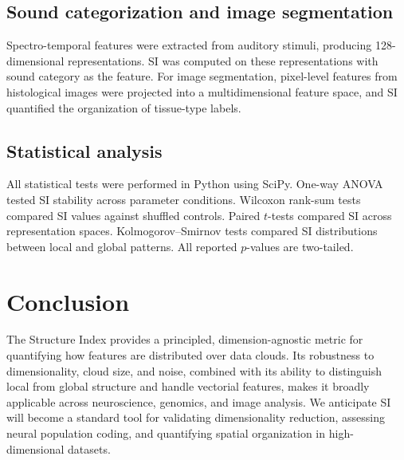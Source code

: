 \documentclass[11pt]{article}
\begin{document}
\subsection{Sound categorization and image segmentation}

Spectro-temporal features were extracted from auditory stimuli, producing 128-dimensional representations. SI was computed on these representations with sound category as the feature. For image segmentation, pixel-level features from histological images were projected into a multidimensional feature space, and SI quantified the organization of tissue-type labels.

\subsection{Statistical analysis}

All statistical tests were performed in Python using SciPy. One-way ANOVA tested SI stability across parameter conditions. Wilcoxon rank-sum tests compared SI values against shuffled controls. Paired $t$-tests compared SI across representation spaces. Kolmogorov--Smirnov tests compared SI distributions between local and global patterns. All reported $p$-values are two-tailed.

\section{Conclusion}

The Structure Index provides a principled, dimension-agnostic metric for quantifying how features are distributed over data clouds. Its robustness to dimensionality, cloud size, and noise, combined with its ability to distinguish local from global structure and handle vectorial features, makes it broadly applicable across neuroscience, genomics, and image analysis. We anticipate SI will become a standard tool for validating dimensionality reduction, assessing neural population coding, and quantifying spatial organization in high-dimensional datasets.



\end{document}
